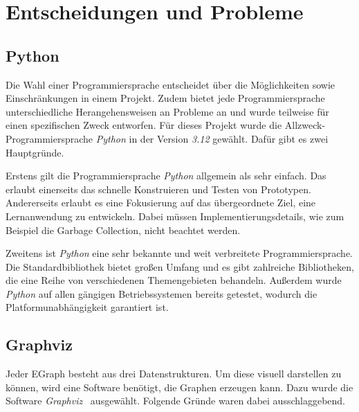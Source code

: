 \section{Entscheidungen und Probleme}\label{sec:entscheidungenundprobleme}

\subsection{Python}

Die Wahl einer Programmiersprache entscheidet über die Möglichkeiten sowie Einschränkungen in einem Projekt.
Zudem bietet jede Programmiersprache unterschiedliche Herangehensweisen an Probleme an und wurde teilweise für einen spezifischen Zweck entworfen.
Für dieses Projekt wurde die Allzweck-Programmiersprache \textit{Python} in der Version \textit{3.12} gewählt.
Dafür gibt es zwei Hauptgründe. 

\noindent Erstens gilt die Programmiersprache \textit{Python} allgemein als sehr einfach. 
Das erlaubt einerseits das schnelle Konstruieren und Testen von Prototypen. 
Andererseits erlaubt es eine Fokusierung auf das übergeordnete Ziel, eine Lernanwendung zu entwickeln. Dabei müssen Implementierungsdetails, wie zum Beispiel
die Garbage Collection, nicht beachtet werden.

Zweitens ist \textit{Python} eine sehr bekannte und weit verbreitete Programmiersprache. 
Die Standardbibliothek bietet großen Umfang und es gibt zahlreiche Bibliotheken, die eine Reihe von verschiedenen Themengebieten behandeln.
Außerdem wurde \textit{Python} auf allen gängigen Betriebssystemen bereits getestet, wodurch die Platformunabhängigkeit garantiert ist.

\subsection{Graphviz}

Jeder EGraph besteht aus drei Datenstrukturen. Um diese visuell darstellen zu können, wird eine Software benötigt, die Graphen erzeugen kann.
Dazu wurde die Software \textit{Graphviz}~\cite{graphviz} ausgewählt. Folgende Gründe waren dabei ausschlaggebend.

